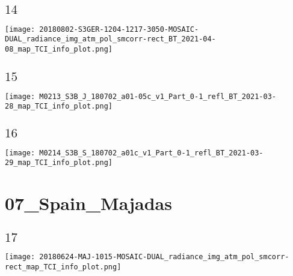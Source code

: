 \documentclass[9pt]{beamer}
\begin{document}
\subsection{$14$}
\begin{frame}
\begin{center}
\texttt{[image: 20180802-S3GER-1204-1217-3050-MOSAIC-DUAL\_radiance\_img\_atm\_pol\_smcorr-rect\_BT\_2021-04-08\_map\_TCI\_info\_plot.png]}
\end{center}
\end{frame}

\subsection{$15$}
\begin{frame}
\begin{center}
\texttt{[image: M0213\_S3B\_J\_180702\_a01-05c\_v1\_Part\_0-1\_refl\_BT\_2021-03-28\_map\_TCI\_info\_plot.png]}
\end{center}
\end{frame}

\subsection{$16$}
\begin{frame}
\begin{center}
\texttt{[image: M0214\_S3B\_S\_180702\_a01c\_v1\_Part\_0-1\_refl\_BT\_2021-03-29\_map\_TCI\_info\_plot.png]}
\end{center}
\end{frame}

\section{07\_Spain\_Majadas}

\subsection{$17$}
\begin{frame}
\begin{center}
\texttt{[image: 20180624-MAJ-1015-MOSAIC-DUAL\_radiance\_img\_atm\_pol\_smcorr-rect\_map\_TCI\_info\_plot.png]}
\end{center}
\end{frame}
\end{document}
